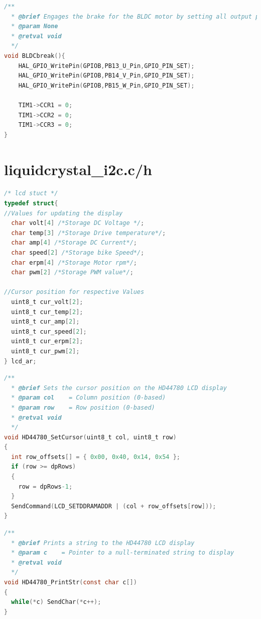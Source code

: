 \documentclass[paper=a4,11pt]{scrreprt}
\begin{document}
\begin{lstlisting}[language=C, caption=\textbf{void BLDCbreak()},label={BLbreak}, mathescape=true, breaklines=true]
/**
  * @brief Engages the brake for the BLDC motor by setting all output phases high and stopping PWM signals
  * @param None
  * @retval void
  */
void BLDCbreak(){
	HAL_GPIO_WritePin(GPIOB,PB13_U_Pin,GPIO_PIN_SET);
	HAL_GPIO_WritePin(GPIOB,PB14_V_Pin,GPIO_PIN_SET);
	HAL_GPIO_WritePin(GPIOB,PB15_W_Pin,GPIO_PIN_SET);

	TIM1->CCR1 = 0;
	TIM1->CCR2 = 0;
	TIM1->CCR3 = 0;
}
\end{lstlisting}
\newpage
\section{liquidcrystal\_i2c.c/h}
\begin{lstlisting}[language=C, caption=\textbf{lcd struct},label={struct},mathescape=true, breaklines=true] 
/* lcd stuct */
typedef struct{
//Values for updating the display
  char volt[4] /*Storage DC Voltage */;
  char temp[3] /*Storage Drive temperature*/;
  char amp[4] /*Storage DC Current*/;
  char speed[2] /*Storage bike Speed*/;
  char erpm[4] /*Storage Motor rpm*/;
  char pwm[2] /*Storage PWM value*/;

//Cursor position for respective Values
  uint8_t cur_volt[2];
  uint8_t cur_temp[2];
  uint8_t cur_amp[2];
  uint8_t cur_speed[2];
  uint8_t cur_erpm[2];
  uint8_t cur_pwm[2];
} lcd_ar;
\end{lstlisting}

\begin{lstlisting}[language=C, caption=\textbf{void HD44780\_SetCursor(uint8\_t col, uint8\_t row)},label={setC}, mathescape=true, breaklines=true]
/**
  * @brief Sets the cursor position on the HD44780 LCD display
  * @param col    = Column position (0-based)
  * @param row    = Row position (0-based)
  * @retval void
  */
void HD44780_SetCursor(uint8_t col, uint8_t row)
{
  int row_offsets[] = { 0x00, 0x40, 0x14, 0x54 };
  if (row >= dpRows)
  {
    row = dpRows-1;
  }
  SendCommand(LCD_SETDDRAMADDR | (col + row_offsets[row]));
}
\end{lstlisting}

\begin{lstlisting}[language=C, caption=\textbf{void HD44780\_PrintStr(const char c[])},label={print}, mathescape=true, breaklines=true]
/**
  * @brief Prints a string to the HD44780 LCD display
  * @param c    = Pointer to a null-terminated string to display
  * @retval void
  */
void HD44780_PrintStr(const char c[])
{
  while(*c) SendChar(*c++);
}
\end{lstlisting}
\end{document}
